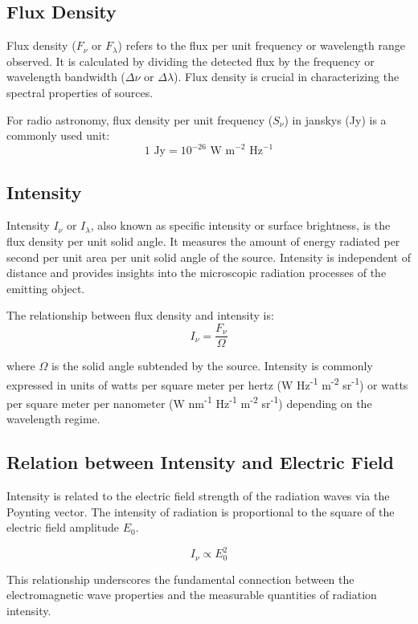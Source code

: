 \subsection{Flux Density}

Flux density ($F_{\nu}$ or $F_{\lambda}$) refers to the flux per unit frequency or wavelength range observed. It is calculated by dividing the detected flux by the frequency or wavelength bandwidth (\( \Delta \nu \) or \( \Delta \lambda \)). Flux density is crucial in characterizing the spectral properties of sources.

For radio astronomy, flux density per unit frequency (\( S_{\nu} \)) in janskys (Jy) is a commonly used unit:
\[ 1 \text{ Jy} = 10^{-26} \text{ W m}^{-2} \text{ Hz}^{-1} \]

\subsection{Intensity}

Intensity $I_{\nu}$ or $I_{\lambda}$, also known as specific intensity or surface brightness, is the flux density per unit solid angle. It measures the amount of energy radiated per second per unit area per unit solid angle of the source. Intensity is independent of distance and provides insights into the microscopic radiation processes of the emitting object.

The relationship between flux density and intensity is:
\[ I_\nu = \frac{F_\nu}{\Omega} \]

where \( \Omega \) is the solid angle subtended by the source. Intensity is commonly expressed in units of watts per square meter per hertz (W Hz\textsuperscript{-1} m\textsuperscript{-2} sr\textsuperscript{-1}) or watts per square meter per nanometer (W nm\textsuperscript{-1} Hz\textsuperscript{-1} m\textsuperscript{-2} sr\textsuperscript{-1}) depending on the wavelength regime.

\subsection{Relation between Intensity and Electric Field}

Intensity is related to the electric field strength of the radiation waves via the Poynting vector. The intensity of radiation is proportional to the square of the electric field amplitude \( E_0 \).

\[ I_\nu \propto E_0^2 \]

This relationship underscores the fundamental connection between the electromagnetic wave properties and the measurable quantities of radiation intensity.

